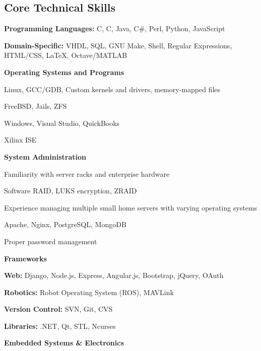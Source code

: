 \documentclass[10pt,letterpaper]{article}
\newcommand{\CPP}
{C\nolinebreak[4]\hspace{-.05em}\raisebox{.22ex}{\footnotesize\bf ++}}
\begin{document}
\subsection*{Core Technical Skills}
\begin{itemize*}
    \item \textbf{Programming Languages:} C, \CPP, Java, C\#, Perl,
            Python, JavaScript
    \item \textbf{Domain-Specific:} VHDL, SQL, GNU Make, Shell, Regular
            Expressions, HTML/CSS, \LaTeX, Octave/MATLAB
    \item \textbf{Operating Systems and Programs}
        \begin{itemize*}
            \item Linux, GCC/GDB, Custom kernels and drivers, memory-mapped files
            \item FreeBSD, Jails, ZFS
            \item Windows, Visual Studio, QuickBooks
            \item Xilinx ISE
        \end{itemize*}
    \item \textbf{System Administration}
        \begin{itemize*}
            \item Familiarity with server racks and enterprise hardware
            \item Software RAID, LUKS encryption, ZRAID
            \item Experience managing multiple small home servers with varying
                operating systems
            \item Apache, Nginx, PostgreSQL, MongoDB
            \item Proper password management
        \end{itemize*}
    \item \textbf{Frameworks}
        \begin{itemize*}
            \item \textbf{Web:} Django, Node.js, Express, Angular.js, Bootstrap,
                    jQuery, OAuth
            \item \textbf{Robotics:} Robot Operating System (ROS), MAVLink
            \item \textbf{Version Control:} SVN, Git, CVS
            \item \textbf{Libraries:} .NET, Qt, STL, Ncurses
        \end{itemize*}
    \item \textbf{Embedded Systems \& Electronics}

\end{itemize*}
\end{document}
